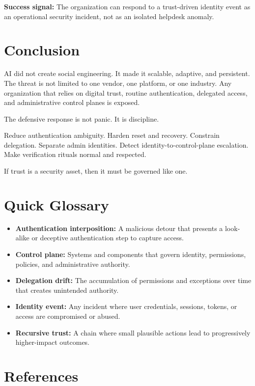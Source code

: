 \documentclass[11pt]{article}
\begin{document}
\textbf{Success signal:}
The organization can respond to a trust-driven identity event as an operational security incident, not as an isolated helpdesk anomaly.

\section{Conclusion}

AI did not create social engineering. It made it scalable, adaptive, and persistent. The threat is not limited to one vendor, one platform, or one industry. Any organization that relies on digital trust, routine authentication, delegated access, and administrative control planes is exposed.

The defensive response is not panic. It is discipline.

Reduce authentication ambiguity. Harden reset and recovery. Constrain delegation. Separate admin identities. Detect identity-to-control-plane escalation. Make verification rituals normal and respected.

If trust is a security asset, then it must be governed like one.

\clearpage
\appendix

\section{Quick Glossary}

\begin{itemize}[leftmargin=1.5em]
    \item \textbf{Authentication interposition:} A malicious detour that presents a look-alike or deceptive authentication step to capture access.
    \item \textbf{Control plane:} Systems and components that govern identity, permissions, policies, and administrative authority.
    \item \textbf{Delegation drift:} The accumulation of permissions and exceptions over time that creates unintended authority.
    \item \textbf{Identity event:} Any incident where user credentials, sessions, tokens, or access are compromised or abused.
    \item \textbf{Recursive trust:} A chain where small plausible actions lead to progressively higher-impact outcomes.
\end{itemize}

\section{References}
\end{document}
